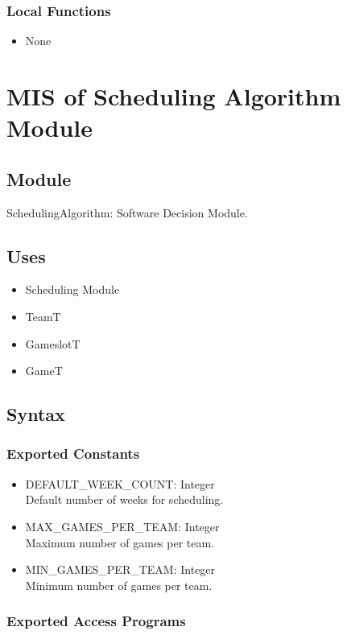 \documentclass[12pt, titlepage]{article}
\begin{document}
\subsubsection{Local Functions}
\begin{itemize}
    \item None
\end{itemize}

\newpage

\section{MIS of Scheduling Algorithm Module} \label{SchedulingAlgorithmModule}

\subsection{Module}
SchedulingAlgorithm: Software Decision Module.

\subsection{Uses}
\begin{itemize}
  \item Scheduling Module
  \item TeamT
  \item GameslotT
  \item GameT
\end{itemize}

\subsection{Syntax}

\subsubsection{Exported Constants}
\begin{itemize}
  \item DEFAULT\_WEEK\_COUNT: Integer \\ Default number of weeks for scheduling.
  \item MAX\_GAMES\_PER\_TEAM: Integer \\ Maximum number of games per team.
  \item MIN\_GAMES\_PER\_TEAM: Integer \\ Minimum number of games per team.
\end{itemize}

\subsubsection{Exported Access Programs}
\end{document}
